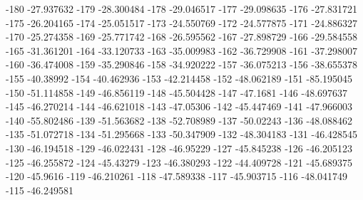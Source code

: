 -180                      -27.937632
-179                      -28.300484
-178                      -29.046517
-177                      -29.098635
-176                      -27.831721
-175                      -26.204165
-174                      -25.051517
-173                      -24.550769
-172                      -24.577875
-171                      -24.886327
-170                      -25.274358
-169                      -25.771742
-168                      -26.595562
-167                      -27.898729
-166                      -29.584558
-165                      -31.361201
-164                      -33.120733
-163                      -35.009983
-162                      -36.729908
-161                      -37.298007
-160                      -36.474008
-159                      -35.290846
-158                      -34.920222
-157                      -36.075213
-156                      -38.655378
-155                       -40.38992
-154                      -40.462936
-153                      -42.214458
-152                      -48.062189
-151                      -85.195045
-150                      -51.114858
-149                      -46.856119
-148                      -45.504428
-147                        -47.1681
-146                      -48.697637
-145                      -46.270214
-144                      -46.621018
-143                       -47.05306
-142                      -45.447469
-141                      -47.966003
-140                      -55.802486
-139                      -51.563682
-138                      -52.708989
-137                       -50.02243
-136                      -48.088462
-135                      -51.072718
-134                      -51.295668
-133                      -50.347909
-132                      -48.304183
-131                      -46.428545
-130                      -46.194518
-129                      -46.022431
-128                       -46.95229
-127                      -45.845238
-126                      -46.205123
-125                      -46.255872
-124                       -45.43279
-123                      -46.380293
-122                      -44.409728
-121                      -45.689375
-120                        -45.9616
-119                      -46.210261
-118                      -47.589338
-117                      -45.903715
-116                      -48.041749
-115                      -46.249581
